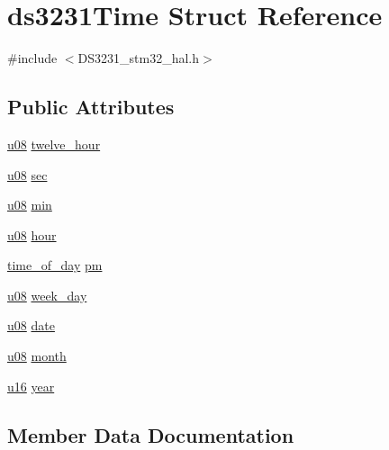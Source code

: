 \hypertarget{structds3231Time}{}\section{ds3231\+Time Struct Reference}
\label{structds3231Time}


{\ttfamily \#include $<$D\+S3231\+\_\+stm32\+\_\+hal.\+h$>$}

\subsection*{Public Attributes}
\begin{DoxyCompactItemize}
\item 
\hyperlink{main_8h_ae2b6b8613a28b013c8c7fdaf93cdb1e1}{u08} \hyperlink{structds3231Time_a63132a576ab3e42364166a69bd666928}{twelve\+\_\+hour}
\item 
\hyperlink{main_8h_ae2b6b8613a28b013c8c7fdaf93cdb1e1}{u08} \hyperlink{structds3231Time_a77bddffed38f1acd8ed12155bd82816d}{sec}
\item 
\hyperlink{main_8h_ae2b6b8613a28b013c8c7fdaf93cdb1e1}{u08} \hyperlink{structds3231Time_a3595434a68bda44d24bfa7a8c839418b}{min}
\item 
\hyperlink{main_8h_ae2b6b8613a28b013c8c7fdaf93cdb1e1}{u08} \hyperlink{structds3231Time_aa05da4e75303218734188aa8475fa629}{hour}
\item 
\hyperlink{DS3231__stm32__hal_8h_ab6153795b3885e1d0215e3c26f302eea}{time\+\_\+of\+\_\+day} \hyperlink{structds3231Time_ac7a03a1bcf075c4e07c74af0045cbca6}{pm}
\item 
\hyperlink{main_8h_ae2b6b8613a28b013c8c7fdaf93cdb1e1}{u08} \hyperlink{structds3231Time_ac3a99ede54dd49063699038f7fcadf89}{week\+\_\+day}
\item 
\hyperlink{main_8h_ae2b6b8613a28b013c8c7fdaf93cdb1e1}{u08} \hyperlink{structds3231Time_afcd4b66ed79418894d07d6179f056001}{date}
\item 
\hyperlink{main_8h_ae2b6b8613a28b013c8c7fdaf93cdb1e1}{u08} \hyperlink{structds3231Time_ae702f51286301b2fd9587815e4a0c987}{month}
\item 
\hyperlink{main_8h_a2b19d553290a8d4a083d3c03280ea800}{u16} \hyperlink{structds3231Time_aa0cb62f96994a2273838c848c033796e}{year}
\end{DoxyCompactItemize}


\subsection{Member Data Documentation}
\mbox{\label{structds3231Time_afcd4b66ed79418894d07d6179f056001}} 
